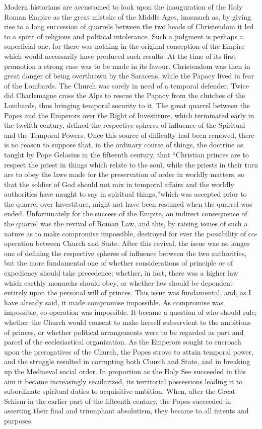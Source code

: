 \documentclass{book}
\begin{document}
Modern historians are accustomed to look upon the inauguration of the Holy Roman Empire as the great mistake of the Middle Ages, inasmuch as, by giving rise to a long succession of quarrels between the two heads of Christendom it led to a spirit of religious and political intolerance. Such a judgment is perhaps a superficial one, for there was nothing in the original conception of the Empire which would necessarily have produced such results. At the time of its first promotion a strong case was to be made in its favour. Christendom was then in great danger of being overthrown by the Saracens, while the Papacy lived in fear of the Lombards. The Church was sorely in need of a temporal defender. Twice did Charlemagne cross the Alps to rescue the Papacy from the clutches of the Lombards, thus bringing temporal security to it. The great quarrel between the Popes and the Emperors over the Right of Investiture, which terminated early in the twelfth century, defined the respective spheres of influence of the Spiritual and the Temporal Powers. Once this source of difficulty had been removed, there is no reason to suppose that, in the ordinary course of things, the doctrine as taught by Pope Gelasius in the fifteenth century, that “Christian princes are to respect the priest in things which relate to the soul, while the priests in their turn are to obey the laws made for the preservation of order in worldly matters, so that the soldier of God should not mix in temporal affairs and the worldly authorities have naught to say in spiritual things,”\footnotemark[10] which was accepted prior to the quarrel over Investiture, might not have been resumed when the quarrel was ended. Unfortunately for the success of the Empire, an indirect consequence of the quarrel was the revival of Roman Law, and this, by raising issues of such a nature as to make compromise impossible, destroyed for ever the possibility of co-operation between Church and State. After this revival, the issue was no longer one of defining the respective spheres of influence between the two authorities, but the more fundamental one of whether considerations of principle or of expediency should take precedence; whether, in fact, there was a higher law which earthly monarchs should obey, or whether law should be dependent entirely upon the personal will of princes. This issue was fundamental, and, as I have already said, it made compromise impossible. As compromise was impossible, co-operation was impossible. It became a question of who should rule; whether the Church would consent to make herself subservient to the ambitions of princes, or whether political arrangements were to be regarded as part and parcel of the ecclesiastical organization. As the Emperors sought to encroach upon the prerogatives of the Church, the Popes strove to attain temporal power, and the struggle resulted in corrupting both Church and State, and in breaking up the Mediaeval social order. In proportion as the Holy See succeeded in this aim it became increasingly secularized, its territorial possessions leading it to subordinate spiritual duties to acquisitive ambition. When, after the Great Schism in the earlier part of the fifteenth century, the Popes succeeded in asserting their final and triumphant absolutism, they became to all intents and purposes 
\end{document}
